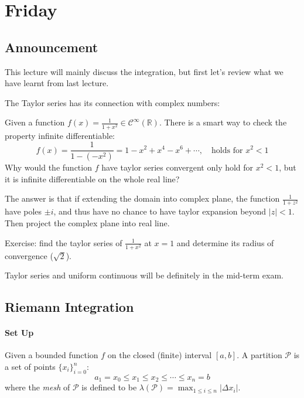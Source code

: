 
\section{Friday}
\subsection{Announcement}
This lecture will mainly discuss the integration, but first let's review what we have learnt from last lecture.

The Taylor series has its connection with complex numbers:
\begin{example}
Given a function $f(x)=\frac{1}{1+x^2}$$\in\mathcal{C}^\infty(\mathbb{R})$. There is a smart way to check the property infinite differentiable:
\[
f(x)=\frac{1}{1-(-x^2)}=1-x^2+x^4-x^6+\cdots,\quad\mbox{holds for $x^2<1$}
\]
Why would the function $f$ have taylor series convergent only hold for $x^2<1$, but it is infinite differentiable on the whole real line?

The answer is that if extending the domain into complex plane, the function $\frac{1}{1+z^2}$ have poles $\pm i$, and thus have no chance to have taylor expansion beyond $|z|<1$. Then project the complex plane into real line.

Exercise: find the taylor series of $\frac{1}{1+x^2}$ at $x=1$ and determine its radius of convergence ($\sqrt{2}$).
\end{example}
Taylor series and uniform continuous will be definitely in the mid-term exam.

\subsection{Riemann Integration}
\paragraph{Set Up}
Given a bounded function $f$ on the closed (finite) interval $[a,b]$. A partition $\mathcal{P}$ is a set of points $\{x_i\}_{i=0}^n$:
\[
a_1=x_0\le x_1\le x_2\le\cdots\le x_n=b
\]
where the \emph{mesh} of $\mathcal{P}$ is defined to be $\lambda(\mathcal{P})=\max_{1\le i\le n}|\Delta x_i|$.

